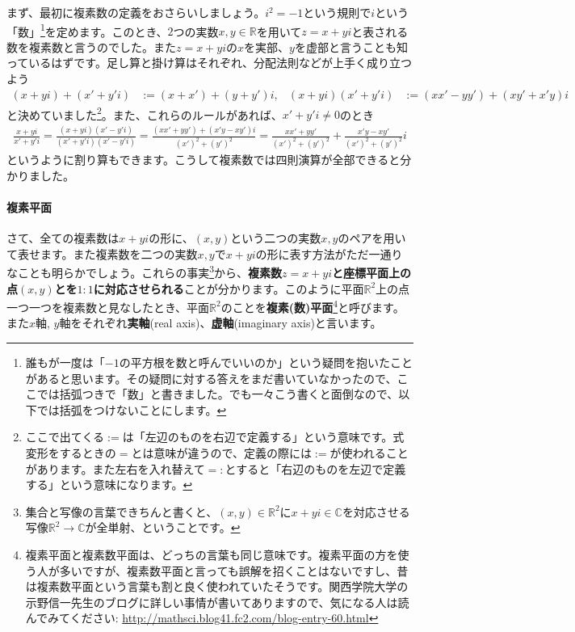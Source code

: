 まず、最初に複素数の定義をおさらいしましょう。$i^2=-1$という規則で$i$という「数」\footnote{誰もが一度は「$-1$の平方根を数と呼んでいいのか」という疑問を抱いたことがあると思います。その疑問に対する答えをまだ書いていなかったので、ここでは括弧つきで「数」と書きました。でも一々こう書くと面倒なので、以下では括弧をつけないことにします。}を定めます。このとき、$2$つの実数$x,y\in\mathbb{R}$を用いて$z=x+yi$と表される数を複素数と言うのでした。また$z=x+yi$の$x$を実部、$y$を虚部と言うことも知っているはずです。足し算と掛け算はそれぞれ、分配法則などが上手く成り立つよう
\begin{align*}
(x+yi) + (x'+y'i) &:= (x+x')+(y+y')i, &  (x+yi)(x'+y'i) &:= (xx' - yy') + (xy'+x'y)i
\end{align*}
と決めていました\footnote{ここで出てくる$:=$は「左辺のものを右辺で定義する」という意味です。式変形をするときの$=$とは意味が違うので、定義の際には$:=$が使われることがあります。また左右を入れ替えて$=:$とすると「右辺のものを左辺で定義する」という意味になります。}。また、これらのルールがあれば、$x'+y'i\neq 0$のとき
\begin{align*}
\frac{x+yi}{x'+y'i}
= \frac{(x+yi)(x'-y'i)}{(x'+y'i)(x'-y'i)} = \frac{(xx'+yy')+(x'y-xy')i}{(x')^2+(y')^2}
= \frac{xx'+yy'}{(x')^2+(y')^2} + \frac{x'y-xy'}{(x')^2+(y')^2}i
\end{align*}
というように割り算もできます。こうして複素数では四則演算が全部できると分かりました。

\paragraph{複素平面}

さて、全ての複素数は$x+yi$の形に、$(x,y)$という二つの実数$x,y$のペアを用いて表せます。また複素数を二つの実数$x,y$で$x+yi$の形に表す方法がただ一通りなことも明らかでしょう。これらの事実\footnote{集合と写像の言葉できちんと書くと、$(x,y)\in\mathbb{R}^2$に$x+yi\in\mathbb{C}$を対応させる写像$\mathbb{R}^2\rightarrow\mathbb{C}$が全単射、ということです。}から、\textbf{複素数$z=x+yi$と座標平面上の点$(x,y)$とを$1:1$に対応させられる}ことが分かります。このように平面$\mathbb{R}^2$上の点一つ一つを複素数と見なしたとき、平面$\mathbb{R}^2$のことを\textbf{複素(数)平面}\footnote{複素平面と複素数平面は、どっちの言葉も同じ意味です。複素平面の方を使う人が多いですが、複素数平面と言っても誤解を招くことはないですし、昔は複素数平面という言葉も割と良く使われていたそうです。関西学院大学の示野信一先生のブログに詳しい事情が書いてありますので、気になる人は読んでみてください: \url{http://mathsci.blog41.fc2.com/blog-entry-60.html}}と呼びます。また$x$軸, $y$軸をそれぞれ\textbf{実軸}(real axis)、\textbf{虚軸}(imaginary axis)と言います。


